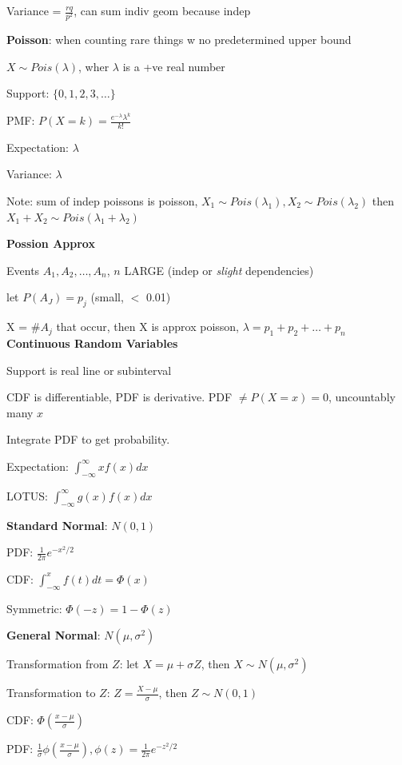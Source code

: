 \documentclass[10pt, a4paper]{article}
\newcommand{\red}[1]{{\color{red}#1}}
\newcommand{\header}[1]{{\normalsize\textbf{#1}}}
\begin{document}
\begin{multicols*}{3}
		Variance = $\frac{rq}{p^2}$, can sum indiv geom because indep

		\textbf{Poisson}: when counting rare things w no predetermined upper bound

		$X \sim Pois(\lambda)$, wher $\lambda$ is a +ve real number

		Support: $\{0, 1, 2, 3, \dots\}$

		PMF: $P(X = k) = \frac{e^{-\lambda} \lambda^k}{k!}$

		Expectation: $\lambda$

		Variance: $\lambda$

		\red{Note}: sum of indep poissons is poisson, $X_1 \sim Pois(\lambda_1), X_2 \sim Pois(\lambda_2)$
		then $X_1 + X_2 \sim Pois(\lambda_1 + \lambda_2)$

		\textbf{Possion Approx}

		Events $A_1, A_2, \dots, A_n$, $n$ LARGE (indep or \textit{slight} dependencies)

		let $P(A_J) = p_j$ (small, $<$ 0.01)

		X = \#$A_j$ that occur, then X is \red{approx} poisson, $\lambda = p_1 + p_2 + \dots + p_n$\\

		\header{Continuous Random Variables}

		Support is real line or subinterval

		CDF is differentiable, PDF is derivative. PDF $\neq P(X = x) = 0$, uncountably many $x$

		Integrate PDF to get probability. 

		Expectation: $\int_{-\infty}^{\infty} xf(x) dx$

		LOTUS: $\int_{-\infty}^{\infty} g(x)f(x) dx$

		\textbf{Standard Normal}: $N(0, 1)$

		PDF: $\frac{1}{2\pi} e^{-x^2/2}$
	
		CDF: $\int_{-\infty}^{x} f(t) dt = \Phi(x)$

		Symmetric: $\Phi(-z) = 1- \Phi(z)$

		\textbf{General Normal}: $N(\mu, \sigma^2)$

		Transformation from $Z$: let $X = \mu + \sigma Z$, then $X \sim N(\mu, \sigma ^2)$

		Transformation to $Z$: $Z = \frac{X - \mu}{\sigma}$, then $Z \sim N(0, 1)$

		CDF: $\Phi(\frac{x - \mu}{\sigma})$

		PDF: $\frac{1}{\sigma} \phi(\frac{x - \mu}{\sigma}), \phi(z) = \frac{1}{2\pi} e^{-z^2 / 2}$


\end{multicols*}
\end{document}
